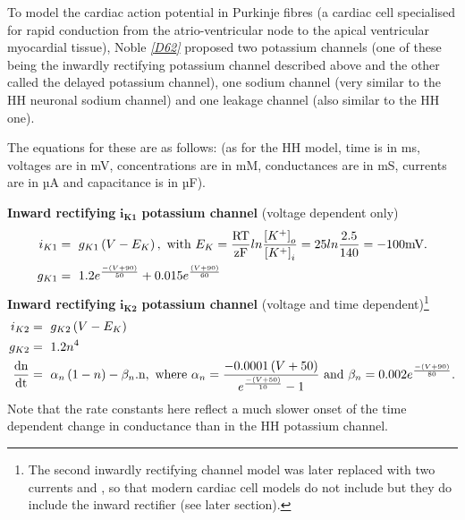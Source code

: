\documentclass[a4paper,10pt,english]{sphinxmanual}
\begin{document}
To model the cardiac action potential in Purkinje fibres (a cardiac cell
specialised for rapid conduction from the atrio-ventricular node to the
apical ventricular myocardial tissue), Noble \label{cellml_import_unit_params:id3}{\hyperref[zreferences:id6]{\emph{{[}D62{]}}}} proposed two potassium
channels (one of these being the inwardly rectifying potassium channel
described above and the other called the delayed potassium channel), one
sodium channel (very similar to the HH neuronal sodium channel) and one
leakage channel (also similar to the HH one).

The equations for these are as follows: (as for the HH model, time is in
ms, voltages are in mV, concentrations are in mM, conductances are in
mS, currents are in µA and capacitance is in µF).

\textbf{Inward rectifying} \(\mathbf{i}_{\mathbf{K}\mathbf{1}}\)
\textbf{potassium channel} (voltage dependent only)
\begin{gather}
\begin{split}i_{K1} &=\ g_{K1}\left( V - E_{K} \right),\text{ with }
E_{K} = \frac{\text{RT}}{\text{zF}}ln\frac{\left\lbrack K^{+} \right\rbrack_{o}}{\left\lbrack K^{+} \right\rbrack_{i}} = 25ln\frac{2.5}{140} = - 100\text{mV}. \\
g_{K1} &=\ 1.2e^{\frac{- \left( V + 90 \right)}{50}} + 0.015e^{\frac{\left( V + 90 \right)}{60}}\end{split}\notag
\end{gather}
\textbf{Inward rectifying} \(\mathbf{i}_{\mathbf{K}\mathbf{2}}\)
\textbf{potassium channel} (voltage and time dependent)\footnote[1]{
The second inwardly rectifying channel model was later replaced with two currents and , so that modern cardiac cell models do not include but they do include the inward rectifier (see later section).
}
\begin{gather}
\begin{split}i_{K2} &=\ g_{K2}\left( V - E_{K} \right) \\
g_{K2} &=\ 1.2n^{4} \\
\frac{\text{dn}}{\text{dt}} &=\ \alpha_{n}\left( 1 - n \right) - \beta_{n}\text{.n},
\text{ where } \alpha_{n} = \frac{- 0.0001\left( V + 50 \right)}{e^{\frac{- \left( V + 50 \right)}{10}} - 1} \text{ and } \beta_{n} = 0.002e^{\frac{- \left( V + 90 \right)}{80}}.\end{split}\notag
\end{gather}
Note that the rate constants here reflect a much slower onset of the
time dependent change in conductance than in the HH potassium channel.
\end{document}
